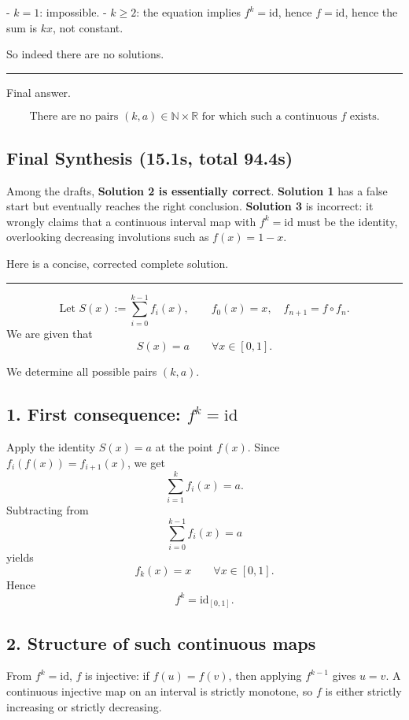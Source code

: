 \documentclass[12pt,a4paper]{article}
\begin{document}
- \(k=1\): impossible.
- \(k\ge 2\): the equation implies \(f^k=\mathrm{id}\), hence \(f=\mathrm{id}\), hence the sum is \(kx\), not constant.

So indeed there are no solutions.


\medskip\hrule\medskip


Final answer.

\[
\boxed{\text{There are no pairs }(k,a)\in\mathbb N\times\mathbb R\text{ for which such a continuous }f\text{ exists.}}
\]
\newpage
\subsection{Final Synthesis (15.1s, total 94.4s)}
Among the drafts, \textbf{Solution 2 is essentially correct}.  
\textbf{Solution 1} has a false start but eventually reaches the right conclusion.  
\textbf{Solution 3} is incorrect: it wrongly claims that a continuous interval map with \(f^k=\mathrm{id}\) must be the identity, overlooking decreasing involutions such as \(f(x)=1-x\).

Here is a concise, corrected complete solution.


\medskip\hrule\medskip


\[
\text{Let }S(x):=\sum_{i=0}^{k-1} f_i(x), \qquad f_0(x)=x,\quad f_{n+1}=f\circ f_n.
\]
We are given that
\[
S(x)=a \qquad \forall x\in[0,1].
\]

We determine all possible pairs \((k,a)\).

\subsection*{1. First consequence: \(f^k=\mathrm{id}\)}

Apply the identity \(S(x)=a\) at the point \(f(x)\). Since \(f_i(f(x))=f_{i+1}(x)\), we get
\[
\sum_{i=1}^{k} f_i(x)=a.
\]
Subtracting from
\[
\sum_{i=0}^{k-1} f_i(x)=a
\]
yields
\[
f_k(x)=x \qquad \forall x\in[0,1].
\]
Hence
\[
f^k=\mathrm{id}_{[0,1]}.
\]

\subsection*{2. Structure of such continuous maps}

From \(f^k=\mathrm{id}\), \(f\) is injective: if \(f(u)=f(v)\), then applying \(f^{k-1}\) gives \(u=v\).  
A continuous injective map on an interval is strictly monotone, so \(f\) is either strictly increasing or strictly decreasing.
\end{document}

